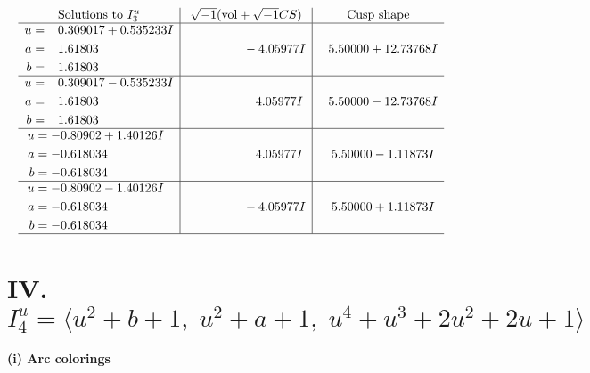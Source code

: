 \documentclass[1p]{elsarticle_modified}
\theoremstyle{definition}
\newcommand{\I}{\sqrt{-1}}
\begin{document}
$$\begin{array}{c|c|c}  
\text{Solutions to }I^u_{3}& \I (\text{vol} + \sqrt{-1}CS) & \text{Cusp shape}\\
 \hline 
\begin{aligned}
u &= \phantom{-}0.309017 + 0.535233 I \\
a &= \phantom{-}1.61803\phantom{ +0.000000I} \\
b &= \phantom{-}1.61803\phantom{ +0.000000I}\end{aligned}
 & \phantom{-0.000000 } -4.05977 I & \phantom{-}5.50000 + 12.73768 I \\ \hline\begin{aligned}
u &= \phantom{-}0.309017 - 0.535233 I \\
a &= \phantom{-}1.61803\phantom{ +0.000000I} \\
b &= \phantom{-}1.61803\phantom{ +0.000000I}\end{aligned}
 & \phantom{-0.000000 -}4.05977 I & \phantom{-}5.50000 - 12.73768 I \\ \hline\begin{aligned}
u &= -0.80902 + 1.40126 I \\
a &= -0.618034\phantom{ +0.000000I} \\
b &= -0.618034\phantom{ +0.000000I}\end{aligned}
 & \phantom{-0.000000 -}4.05977 I & \phantom{-}5.50000 - 1.11873 I \\ \hline\begin{aligned}
u &= -0.80902 - 1.40126 I \\
a &= -0.618034\phantom{ +0.000000I} \\
b &= -0.618034\phantom{ +0.000000I}\end{aligned}
 & \phantom{-0.000000 } -4.05977 I & \phantom{-}5.50000 + 1.11873 I\\
 \hline 
 \end{array}$$\newpage\newpage\renewcommand{\arraystretch}{1}
\centering \section*{IV. $I^u_{4}= \langle u^2+b+1,\;u^2+a+1,\;u^4+u^3+2 u^2+2 u+1 \rangle$}
\flushleft \textbf{(i) Arc colorings}\\
\end{document}
